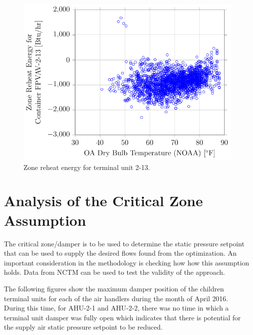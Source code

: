 \begin{figure}
\centering
\includegraphics[]{Plots/2016-10-19-1521-ZoneReheatEnergyforContainerFPVAV213vsOADryBulbTemperatureNOAA.pdf}
\caption{Zone reheat energy for terminal unit 2-13.}
\label{fig:2016-10-19-1521-ZoneReheatEnergyforContainerFPVAV213vsOADryBulbTemperatureNOAA}
\end{figure}


\section{Analysis of the Critical Zone Assumption}

The critical zone/damper is to be used to determine the static pressure setpoint that can be used to supply the desired flows found from the optimization. An important consideration in the methodology is checking how how this assumption holds. Data from NCTM can be used to test the validity of the approach.

The following figures show the maximum damper position of the children terminal units for each of the air handlers during the month of April 2016. During this time, for AHU-2-1 and AHU-2-2, there was no time in which a terminal unit damper was fully open which indicates that there is potential for the supply air static pressure setpoint to be reduced.  

\newcommand{\MaxDampCaption}[1]{Maximum damper position of all children terminal units versus \(\oat{}\) for #1 during the month of April 2016.}

